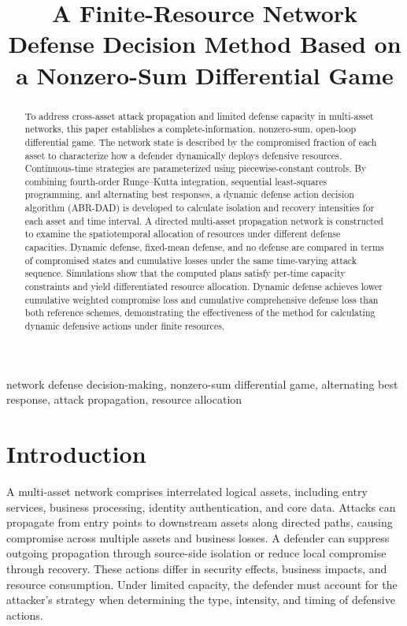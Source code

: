 \documentclass[conference,letterpaper]{IEEEtran}
\title{A Finite-Resource Network Defense Decision Method Based on a Nonzero-Sum Differential Game}
\author{\IEEEauthorblockN{[First Name Last Name]$^{*}$ \qquad [First Name Last Name]}
\IEEEauthorblockA{[Department / School], [University or Organization]\\
\mbox{[City]}, [Postal Code], [Country]\\
\mbox{[corresponding.author@example.edu]}$^{*}$ \quad [coauthor@example.edu]}}
\begin{document}
\maketitle
\begin{abstract}
To address cross-asset attack propagation and limited defense capacity in multi-asset networks, this paper establishes a complete-information, nonzero-sum, open-loop differential game. The network state is described by the compromised fraction of each asset to characterize how a defender dynamically deploys defensive resources. Continuous-time strategies are parameterized using piecewise-constant controls. By combining fourth-order Runge--Kutta integration, sequential least-squares programming, and alternating best responses, a dynamic defense action decision algorithm (ABR-DAD) is developed to calculate isolation and recovery intensities for each asset and time interval. A directed multi-asset propagation network is constructed to examine the spatiotemporal allocation of resources under different defense capacities. Dynamic defense, fixed-mean defense, and no defense are compared in terms of compromised states and cumulative losses under the same time-varying attack sequence. Simulations show that the computed plans satisfy per-time capacity constraints and yield differentiated resource allocation. Dynamic defense achieves lower cumulative weighted compromise loss and cumulative comprehensive defense loss than both reference schemes, demonstrating the effectiveness of the method for calculating dynamic defensive actions under finite resources.
\end{abstract}
\begin{IEEEkeywords}
network defense decision-making, nonzero-sum differential game, alternating best response, attack propagation, resource allocation
\end{IEEEkeywords}

\section{Introduction}
A multi-asset network comprises interrelated logical assets, including entry services, business processing, identity authentication, and core data. Attacks can propagate from entry points to downstream assets along directed paths, causing compromise across multiple assets and business losses. A defender can suppress outgoing propagation through source-side isolation or reduce local compromise through recovery. These actions differ in security effects, business impacts, and resource consumption. Under limited capacity, the defender must account for the attacker's strategy when determining the type, intensity, and timing of defensive actions.
\end{document}
